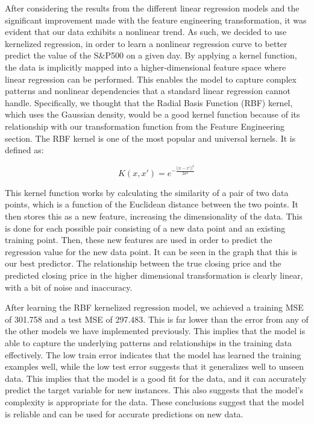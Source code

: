 \documentclass[final,5p,times,twocolumn,authoryear, 12pt]{elsarticle}
\begin{document}
After considering the results from the different linear regression models and the significant improvement made with the feature engineering transformation, it was evident that our data exhibits a nonlinear trend. As such, we decided to use kernelized regression, in order to learn a nonlinear regression curve to better predict the value of the S\&P500 on a given day. By applying a kernel function, the data is implicitly mapped into a higher-dimensional feature space where linear regression can be performed. This enables the model to capture complex patterns and nonlinear dependencies that a standard linear regression cannot handle. Specifically, we thought that the Radial Basis Function (RBF) kernel, which uses the Gaussian density, would be a good kernel function because of its relationship with our transformation function from the Feature Engineering section. The RBF kernel is one of the most popular and universal kernels. It is defined as:

\begin{adjustwidth}{1.8cm}{}
    \[K(x, x') = e^{- \frac{||x - x'||^2}{2\sigma^2}} \]
\end{adjustwidth}

This kernel function works by calculating the similarity of a pair of two data points, which is a function of the Euclidean distance between the two points. It then stores this as a new feature, increasing the dimensionality of the data. This is done for each possible pair consisting of a new data point and an existing training point. Then, these new features are used in order to predict the regression value for the new data point. It can be seen in the graph that this is our best predictor. The relationship between the true closing price and the predicted closing price in the higher dimensional transformation is clearly linear, with a bit of noise and inaccuracy. 

After learning the RBF kernelized regression model, we achieved a training MSE of 301.758 and a test MSE of 297.483. This is far lower than the error from any of the other models we have implemented previously. This implies that the model is able to capture the underlying patterns and relationships in the training data effectively. The low train error indicates that the model has learned the training examples well, while the low test error suggests that it generalizes well to unseen data. This implies that the model is a good fit for the data, and it can accurately predict the target variable for new instances. This also suggests that the model's complexity is appropriate for the data. These conclusions suggest that the model is reliable and can be used for accurate predictions on new data.
\end{document}
